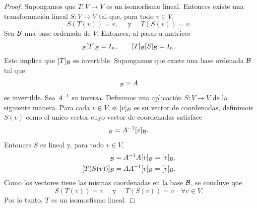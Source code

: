 \documentclass[12pt,a4paper]{article}
\begin{document}
    \begin{proof}
        Supongamos que $T:V\to V$ es un isomorfismo lineal. Entonces existe una transformación
        lineal $S:V\to V$ tal que, para todo $v\in V$,
        \begin{equation*}
            S(T(v))=v,\quad\text{ y }\quad T(S(v))=v.
        \end{equation*}
        Sea $\mathcal{B}$ una base ordenada de $V$. Entonces, al pasar a matrices
        \begin{equation*}
            [S]_{\BB}[T]_{\BB}=I_{n},\qquad [T]_{\BB}[S]_{\BB}=I_{n}.
        \end{equation*}
        Esto implica que $[T]_{\mathcal{B}}$ es invertible. Supongamos que existe una base ordenada $\mathcal{B}$ tal que
        \begin{equation*}
            [T]_{\BB}=A
        \end{equation*}
        es invertible. Sea $A^{-1}$ su inversa. Definimos una aplicación $S:V\to V$ de la siguiente manera.
        Para cada $v\in V$, si $[v]_{\mathcal{B}}$ es su vector de coordenadas, definimois $S(v)$ como el unico vector
        cuyo vector de coordenadas satisface
        \begin{equation*}
            [S(v)]_{\BB}=A^{-1}[v]_{\BB}.
        \end{equation*}
        Entonces $S$ es lineal y, para todo $v\in V$,
        \begin{align*}
            [S(T(v))]_{\BB}=A^{-1}A[v]_{\BB}=[v]_{\BB},\\
            [T(S(v))]_{\BB}=AA^{-1}[v]_{\BB}=[v]_{\BB}.
        \end{align*}
        Como los vectores tiene las mismas coordenadas en la base $\mathcal{B}$, se concluye que
        \begin{equation*}
            S(T(v))=v\quad\text{ y }\quad T(S(v))=v\quad \forall v\in V.
        \end{equation*}
        Por lo tanto, $T$ es un isomorfismo lineal.
    \end{proof}
\end{document}
